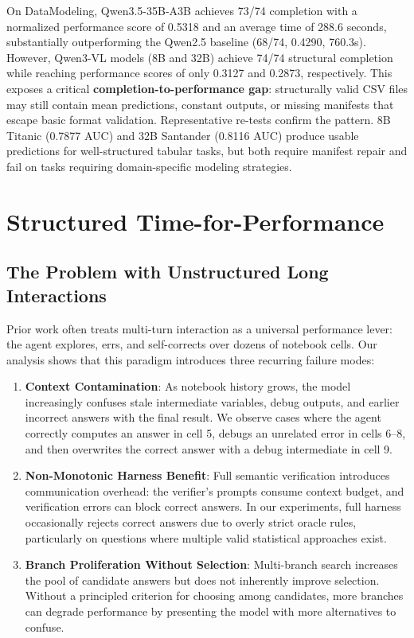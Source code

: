 \documentclass[letterpaper]{article} %
\begin{document}
On DataModeling, Qwen3.5-35B-A3B achieves 73/74 completion with a normalized performance score of 0.5318 and an average time of 288.6 seconds, substantially outperforming the Qwen2.5 baseline (68/74, 0.4290, 760.3s). However, Qwen3-VL models (8B and 32B) achieve 74/74 structural completion while reaching performance scores of only 0.3127 and 0.2873, respectively. This exposes a critical \textbf{completion-to-performance gap}: structurally valid CSV files may still contain mean predictions, constant outputs, or missing manifests that escape basic format validation. Representative re-tests confirm the pattern. 8B Titanic (0.7877 AUC) and 32B Santander (0.8116 AUC) produce usable predictions for well-structured tabular tasks, but both require manifest repair and fail on tasks requiring domain-specific modeling strategies.

\section{Structured Time-for-Performance}
\label{sec:structured}

\subsection{The Problem with Unstructured Long Interactions}

Prior work often treats multi-turn interaction as a universal performance lever: the agent explores, errs, and self-corrects over dozens of notebook cells. Our analysis shows that this paradigm introduces three recurring failure modes:

\begin{enumerate}
    \item \textbf{Context Contamination}: As notebook history grows, the model increasingly confuses stale intermediate variables, debug outputs, and earlier incorrect answers with the final result. We observe cases where the agent correctly computes an answer in cell 5, debugs an unrelated error in cells 6--8, and then overwrites the correct answer with a debug intermediate in cell 9.
    \item \textbf{Non-Monotonic Harness Benefit}: Full semantic verification introduces communication overhead: the verifier's prompts consume context budget, and verification errors can block correct answers. In our experiments, full harness occasionally rejects correct answers due to overly strict oracle rules, particularly on questions where multiple valid statistical approaches exist.
    \item \textbf{Branch Proliferation Without Selection}: Multi-branch search increases the pool of candidate answers but does not inherently improve selection. Without a principled criterion for choosing among candidates, more branches can degrade performance by presenting the model with more alternatives to confuse.
\end{enumerate}
\end{document}
